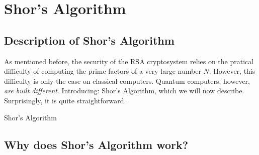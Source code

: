 \documentclass{article}
\begin{document}
\section{Shor's Algorithm}

\subsection{Description of Shor's Algorithm}

As mentioned before, the security of the RSA cryptosystem relies on the pratical difficulty of computing the prime factors of a very large number \(N\). However, this difficulty is only the case on classical computers. Quantum computers, however, \textit{are built different}. Introducing: Shor's Algorithm, which we will now describe. Surprisingly, it is quite straightforward.

\begin{algorithm}
\caption{Shor's Algorithm}
\label{alg:shors}
\begin{algorithmic}[1]
        \State{Let \(g\) be the guess from \([2..N)\)}

    \EndProcedure
\end{algorithmic}
\end{algorithm}


\subsection{Why does Shor's Algorithm work?}
\end{document}
